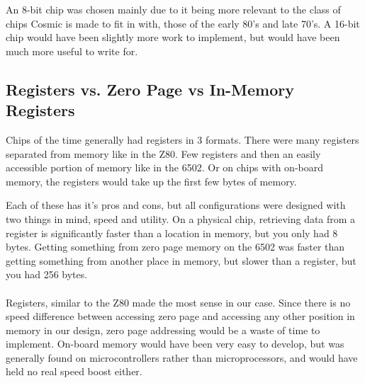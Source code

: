 \documentclass[conference]{IEEEtran}
\begin{document}
An 8-bit chip was chosen mainly due to it being more relevant to the class of chips Cosmic is made to fit in with, those of the early 80's and late 70's. A 16-bit chip would have been slightly more work to implement, but would have been much more useful to write for.

\subsection{Registers vs. Zero Page vs In-Memory Registers}

Chips of the time generally had registers in 3 formats. There were many registers separated from memory like in the Z80. Few registers and then an easily accessible portion of memory like in the 6502. Or on chips with on-board memory, the registers would take up the first few bytes of memory.

Each of these has it's pros and cons, but all configurations were designed with two things in mind, speed and utility. On a physical chip, retrieving data from a register is significantly faster than a location in memory, but you only had 8 bytes. Getting something from zero page memory on the 6502 was faster than getting something from another place in memory, but slower than a register, but you had 256 bytes.\\

\\

Registers, similar to the Z80 made the most sense in our case. Since there is no speed difference between accessing zero page and accessing any other position in memory in our design, zero page addressing would be a waste of time to implement. On-board memory would have been very easy to develop, but was generally found on microcontrollers rather than microprocessors, and would have held no real speed boost either.
\end{document}
